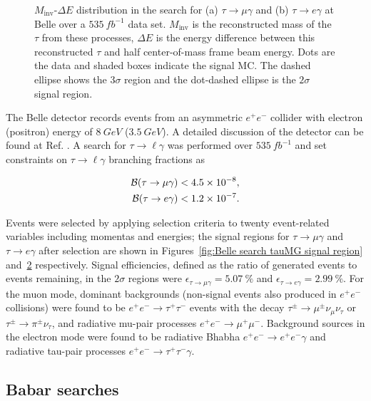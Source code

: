 \documentclass[12pt]{thesis}  %
\newcommand{\br}{\mathcal{B}}
\newcommand{\tmg}{\tau\to\mu\gamma}
\newcommand{\tlg}{\tau\to\ell\gamma}
\begin{document}
\begin{figure}[h]
\begin{subfigure}[b]{0.475\textwidth}
            \caption[]%
            {{\small}}    
            \label{fig:Belle search tauEG signal region}
        \end{subfigure}
        \caption{$M_{\text{inv}}$-$\Delta E$ distribution in the search for (a) $\tau\to\mu\gamma$ and (b) $\tau\to e\gamma$ at Belle over a $\SI{535}{fb^{-1}}$ data set. $M_{\text{inv}}$ is the reconstructed mass of the $\tau$ from these processes, $\Delta E$ is the energy difference between this reconstructed $\tau$ and half center-of-mass frame beam energy. Dots are the data and shaded boxes indicate the signal MC. The dashed ellipse shows the $3\sigma$ region and the dot-dashed ellipse is the $2\sigma$ signal region.}
    \end{figure}


The Belle detector records events from an asymmetric $e^+ e^-$ collider with electron (positron) energy of $\SI{8}{GeV}$ ($\SI{3.5}{GeV}$). A detailed discussion of the detector can be found at Ref. \cite{Abashian:2000cg}. A search for $\tau\to\ell\gamma$ was performed over $\SI{535}{fb^{-1}}$ and set constraints \cite{Hayasaka:2007vc} on $\tlg$ branching fractions as

\begin{align*}
\br(\tmg)&<\num{4.5d-8},\\
\br(\tau\to e \gamma)&<\num{1.2d-7}.
\end{align*}

Events were selected by applying selection criteria to twenty event-related variables including momentas and energies; the signal regions for $\tau\to\mu\gamma$ and $\tau\to e\gamma$ after selection are shown in Figures~\ref{fig:Belle search tauMG signal region} and~\ref{fig:Belle search tauEG signal region} respectively. Signal efficiencies, defined as the ratio of generated events to events remaining, in the $2\sigma$ regions were $\epsilon_{\tau\to\mu\gamma}=\SI{5.07}{\percent}$ and $\epsilon_{\tau\to e\gamma}=\SI{2.99}{\percent}$. For the muon mode, dominant backgrounds (non-signal events also produced in $e^+ e^-$ collisions) were found to be $e^+ e^- \to \tau^+ \tau^-$ events with the decay $\tau^{\pm}\to\mu^{\pm}\nu_{\mu}\nu_{\tau}$ or $\tau^{\pm}\to\pi^{\pm}\nu_{\tau}$, and radiative mu-pair processes $e^+ e^- \to \mu^+ \mu^-$. Background sources in the electron mode were found to be radiative Bhabha $e^+ e^- \to e^+ e^- \gamma$ and radiative tau-pair processes $e^+ e^- \to \tau^+ \tau^- \gamma$. 

\subsection{Babar searches}
\end{document}
